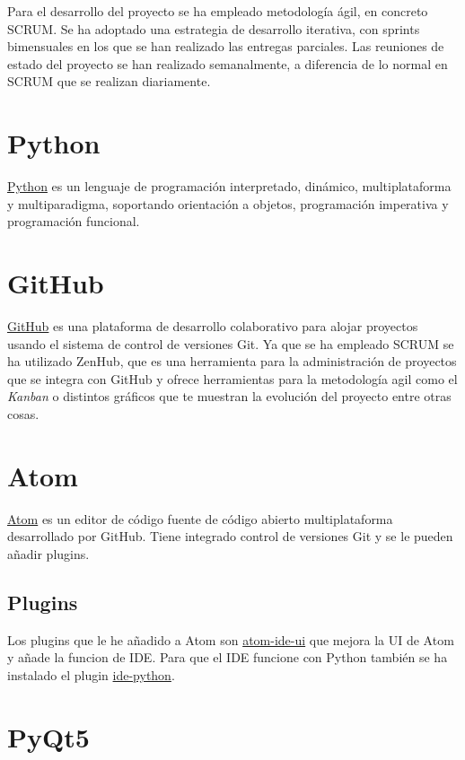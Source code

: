 Para el desarrollo del proyecto se ha empleado metodología ágil, en concreto SCRUM. Se ha adoptado una estrategia de desarrollo iterativa, con sprints bimensuales en los que se han realizado las entregas parciales. Las reuniones de estado del proyecto se han realizado semanalmente, a diferencia de lo normal en SCRUM que se realizan diariamente.

\section{Python}

\href{https://www.python.org/}{Python} es un lenguaje de programación interpretado, dinámico, multiplataforma y multiparadigma, soportando orientación a objetos, programación imperativa y programación funcional.

\section{GitHub}

\href{https://github.com/}{GitHub} \cite{noauthor_GitHub_nodate}es una plataforma de desarrollo colaborativo para alojar proyectos usando el sistema de control de versiones Git. Ya que se ha empleado SCRUM se ha utilizado ZenHub, que es una herramienta para la administración de proyectos que se integra con GitHub y ofrece herramientas para la metodología agil como el \textit{Kanban} o distintos gráficos que te muestran la evolución del proyecto entre otras cosas.

\section{Atom}

\href{https://atom.io/}{Atom} es un editor de código fuente de código abierto multiplataforma desarrollado por GitHub. Tiene integrado control de versiones Git y se le pueden añadir plugins.

\subsection{Plugins}

Los plugins que le he añadido a Atom son \href{https://atom.io/packages/atom-ide-ui}{atom-ide-ui} que mejora la UI de Atom y añade la funcion de IDE. Para que el IDE funcione con Python también se ha instalado el plugin \href{https://atom.io/packages/ide-python}{ide-python}.

\section{PyQt5}

